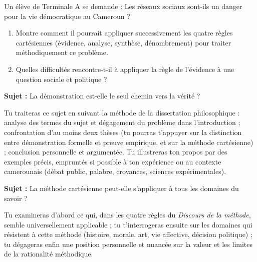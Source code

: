 \documentclass[11pt]{article}
\newcounter{popsec}
\newcounter{popsub}
\newcommand{\courssub}[1]{%
  \stepcounter{popsub}%
  \par\vspace{9pt}\noindent{\popxbold\fontsize{11.5}{13}\selectfont\color{popink}{\color{poporange}\thepopsec.\thepopsub}\hspace{6pt}#1}\par\nopagebreak\vspace{4pt}
}
\begin{document}
\begin{exercice}
Un élève de Terminale A se demande : \guillemotleft Les réseaux sociaux sont-ils un danger pour la vie démocratique au Cameroun ? \guillemotright
\begin{enumerate}
\item Montre comment il pourrait appliquer successivement les quatre règles cartésiennes (évidence, analyse, synthèse, dénombrement) pour traiter méthodiquement ce problème.
\item Quelles difficultés rencontre-t-il à appliquer la règle de l'évidence à une question sociale et politique ?
\end{enumerate}
\end{exercice}

\courssub{Je me prépare au Bac}

\begin{exercice}
\textbf{Sujet :} La démonstration est-elle le seul chemin vers la vérité ?

Tu traiteras ce sujet en suivant la méthode de la dissertation philosophique : analyse des termes du sujet et dégagement du problème dans l'introduction ; confrontation d'au moins deux thèses (tu pourras t'appuyer sur la distinction entre démonstration formelle et preuve empirique, et sur la méthode cartésienne) ; conclusion personnelle et argumentée. Tu illustreras ton propos par des exemples précis, empruntés si possible à ton expérience ou au contexte camerounais (débat public, palabre, croyances, sciences expérimentales).
\end{exercice}

\begin{exercice}
\textbf{Sujet :} La méthode cartésienne peut-elle s'appliquer à tous les domaines du savoir ?

Tu examineras d'abord ce qui, dans les quatre règles du \emph{Discours de la méthode}, semble universellement applicable ; tu t'interrogeras ensuite sur les domaines qui résistent à cette méthode (histoire, morale, art, vie affective, décision politique) ; tu dégageras enfin une position personnelle et nuancée sur la valeur et les limites de la rationalité méthodique.
\end{exercice}
\end{document}
